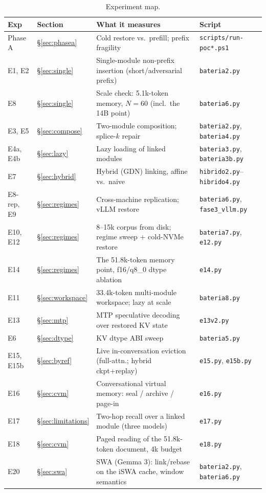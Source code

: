 \documentclass[11pt]{article}
\newcommand{\code}[1]{\texttt{#1}}
\begin{document}
\begin{table}[h]
  \centering\footnotesize
  \setlength{\tabcolsep}{4pt}
  \caption{Experiment map.}
  \label{tab:map}
  \begin{tabular}{llll}
    \toprule
    Exp & Section & What it measures & Script \\
    \midrule
    Phase A & \S\ref{sec:phasea} & Cold restore vs.\ prefill; prefix fragility & \code{scripts/run-poc*.ps1} \\
    E1, E2 & \S\ref{sec:single} & Single-module non-prefix insertion (short/adversarial prefix) & \code{bateria2.py} \\
    E8 & \S\ref{sec:single} & Scale check: 5.1k-token memory, $N{=}60$ (incl.\ the 14B point) & \code{bateria6.py} \\
    E3, E5 & \S\ref{sec:compose} & Two-module composition; splice-$k$ repair & \code{bateria2.py}, \code{bateria4.py} \\
    E4a, E4b & \S\ref{sec:lazy} & Lazy loading of linked modules & \code{bateria3.py}, \code{bateria3b.py} \\
    E7 & \S\ref{sec:hybrid} & Hybrid (GDN) linking, affine vs.\ naive & \code{hibrido2.py}--\code{hibrido4.py} \\
    E8-rep, E9 & \S\ref{sec:regimes} & Cross-machine replication; vLLM restore & \code{bateria6.py}, \code{fase3\_vllm.py} \\
    E10, E12 & \S\ref{sec:regimes} & 8--15k corpus from disk; regime sweep + cold-NVMe restore & \code{bateria7.py}, \code{e12.py} \\
    E14 & \S\ref{sec:regimes} & The 51.8k-token memory point, f16/q8\_0 dtype ablation & \code{e14.py} \\
    E11 & \S\ref{sec:workspace} & 33.4k-token multi-module workspace; lazy at scale & \code{bateria8.py} \\
    E13 & \S\ref{sec:mtp} & MTP speculative decoding over restored KV state & \code{e13v2.py} \\
    E6 & \S\ref{sec:dtype} & KV dtype ABI sweep & \code{bateria5.py} \\
    E15, E15b & \S\ref{sec:byref} & Live in-conversation eviction (full-attn.; hybrid ckpt+replay) & \code{e15.py}, \code{e15b.py} \\
    E16 & \S\ref{sec:cvm} & Conversational virtual memory: seal / archive / page-in & \code{e16.py} \\
    E17 & \S\ref{sec:limitations} & Two-hop recall over a linked module (three models) & \code{e17.py} \\
    E18 & \S\ref{sec:cvm} & Paged reading of the 51.8k-token document, 4k budget & \code{e18.py} \\
    E20 & \S\ref{sec:swa} & SWA (Gemma 3): link/rebase on the iSWA cache, window semantics & \code{bateria2.py}, \code{bateria6.py} \\
    \bottomrule
  \end{tabular}
\end{table}
\end{document}
